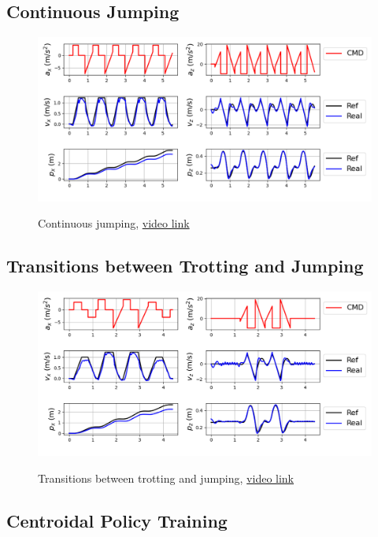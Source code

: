 \documentclass[11pt, conference]{IEEEtran}
\theoremstyle{definition} %
\begin{document}
\subsection{Continuous Jumping}

\begin{figure}[H]
    \centering
        \textsf{\includegraphics[width=0.9\columnwidth]{figures/continuous_jump_tracking.png}}
        \caption{Continuous jumping, \href{https://drive.google.com/file/d/1W2lfmGC67l_4fw870qR48iA-APiqXFV_/view?usp=drive_link}{video link}}
        \label{fig:continuous_jump}
\end{figure}


\subsection{Transitions between Trotting and Jumping}

\begin{figure}[H]
    \centering
        \textsf{\includegraphics[width=0.9\columnwidth]{figures/mix_jump.png}}
        \caption{Transitions between trotting and jumping, \href{https://drive.google.com/file/d/1HB1HqvXQw2wybF_QYKwW6OonTc9PMxFE/view?usp=drive_link}{video link}}
        \label{fig:mix_jump}
\end{figure}


\subsection{Centroidal Policy Training}
\end{document}
